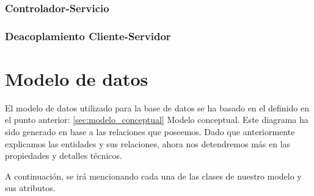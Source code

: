 \subsubsection{Controlador-Servicio}

\subsubsection{Deacoplamiento Cliente-Servidor}

\section{Modelo de datos}\label{sec:modelo_datos}

El modelo de datos utilizado para la base de datos se ha basado en el definido en el punto anterior: \ref{sec:modelo_conceptual} Modelo conceptual. Este diagrama ha sido generado en base a las relaciones que poseemos. Dado que anteriormente explicamos las entidades y sus relaciones, ahora nos detendremos más en las propiedades y detalles técnicos.


A continuación, se irá mencionando cada una de las clases de nuestro modelo y sus atributos.

